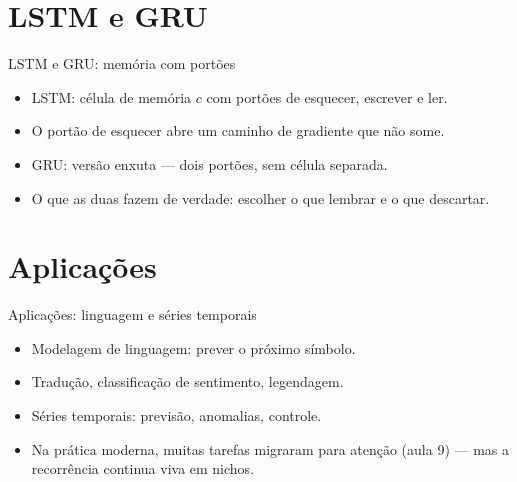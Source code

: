 \documentclass[aspectratio=169, 11pt]{beamer}
\begin{document}
\section{LSTM e GRU}

\begin{frame}{LSTM e GRU: memória com portões}
  \begin{itemize}\setlength{\itemsep}{0.4ex}
    \item LSTM: célula de memória $c$ com portões de esquecer, escrever e ler.
    \item O portão de esquecer abre um caminho de gradiente que não some.
    \item GRU: versão enxuta — dois portões, sem célula separada.
    \item O que as duas fazem de verdade: escolher o que lembrar e o que
          descartar.
  \end{itemize}
\end{frame}

\section{Aplicações}

\begin{frame}{Aplicações: linguagem e séries temporais}
  \begin{itemize}\setlength{\itemsep}{0.4ex}
    \item Modelagem de linguagem: prever o próximo símbolo.
    \item Tradução, classificação de sentimento, legendagem.
    \item Séries temporais: previsão, anomalias, controle.
    \item Na prática moderna, muitas tarefas migraram para atenção (aula 9) —
          mas a recorrência continua viva em nichos.
  \end{itemize}
\end{frame}
\end{document}
